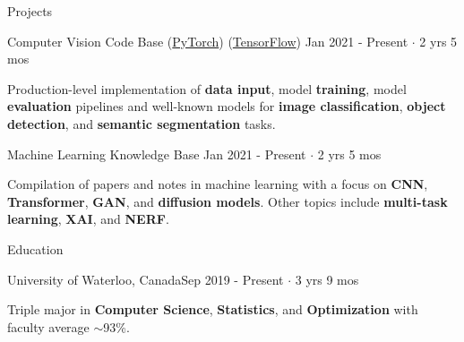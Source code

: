 \documentclass{resume}
\begin{document}
\begin{rSection}{Projects}


    \begin{rSubsection}{Computer Vision Code Base
            (\href{https://github.com/danielmao2019/Computer-Vision-PyTorch}{\faGithub PyTorch})
            (\href{https://github.com/danielmao2019/Computer-Vision-TensorFlow}{\faGithub TensorFlow})
        }{Jan 2021 - Present \(\cdot\) 2 yrs 5 mos}{}{}
        \item Production-level implementation of \textbf{data input}, model \textbf{training}, model \textbf{evaluation} pipelines and well-known models for \textbf{image classification}, \textbf{object detection}, and \textbf{semantic segmentation} tasks.
    \end{rSubsection}
    \begin{rSubsection}{Machine Learning Knowledge Base
            \href{https://github.com/danielmao2019/Machine-Learning-Knowledge-Base}{\faGithub}
        }{Jan 2021 - Present \(\cdot\) 2 yrs 5 mos}{}{}
        \item Compilation of papers and notes in machine learning with a focus on \textbf{CNN}, \textbf{Transformer}, \textbf{GAN}, and \textbf{diffusion models}. Other topics include \textbf{multi-task learning}, \textbf{XAI}, and \textbf{NERF}.
    \end{rSubsection}

\end{rSection}

\begin{rSection}{Education}

    \begin{rSubsection}{University of Waterloo, Canada}{Sep 2019 - Present \(\cdot\) 3 yrs 9 mos}{}{}
        \item Triple major in \textbf{Computer Science}, \textbf{Statistics}, and \textbf{Optimization} with faculty average \(\sim\)93\%.
    \end{rSubsection}

\end{rSection}
\end{document}
